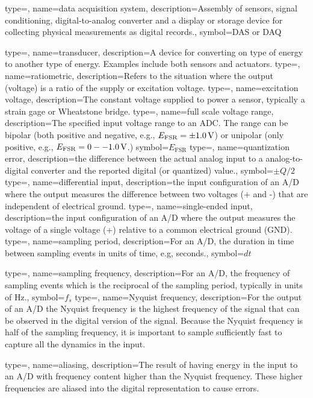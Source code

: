 
{type=\thisgls,
name={data acquisition system},
description={Assembly of sensors, signal conditioning, digital-to-analog converter and a display or storage device for collecting physical measurements as digital records.},
symbol={DAS or DAQ}
}

{type=\thisgls,
name=transducer,
description={A device for converting on type of energy to another type of energy.  Examples include both sensors and actuators.}
}
{type=\thisgls,
name=ratiometric,
description={Refers to the situation where the output (voltage) is a ratio of the supply or excitation voltage.}
}
{type=\thisgls,
name=excitation voltage,
description={The constant voltage supplied to power a sensor, typically a strain gage or Wheatstone bridge.}
}
{type=\thisgls,
name={full scale voltage range},
description={The specified input voltage range to an ADC.  The range can be bipolar (both positive and negative, e.g., $E_{\mathrm{FSR}}=\pm\unit[1.0]{V}$) or unipolar (only positive, e.g.,  $E_{\mathrm{FSR}}=\unit[0--1.0]{V}$.)}
symbol={\ensuremath{E_{\mathrm{FSR}}}}
}
{type=\thisgls,
name={quantization error},
description={the difference between the actual analog input to a analog-to-digital converter and the reported digital (or quantized) value.},
symbol={\ensuremath{\pm Q/2}}
}
{type=\thisgls,
name={differential input},
description={the input configuration of an A/D where the output measures the difference between two voltages (+ and -) that are independent of electrical ground.}
}
{type=\thisgls,
name={single-ended input},
description={the input configuration of an A/D where the output measures the voltage of a single voltage (+) relative to a common electrical ground (GND).}
}
{type=\thisgls,
name={sampling period},
description={For an A/D, the duration in time between sampling events in units of time, e.g, seconds.},
symbol={\ensuremath{dt}}
}

{type=\thisgls,
name={sampling frequency},
description={For an A/D, the frequency of sampling events which is the reciprocal of the sampling period, typically in units of Hz.},
symbol={\ensuremath{f_s}}
}
{type=\thisgls,
name={Nyquist frequency},
description={For the output of an A/D the Nyquist frequency is the highest frequency of the signal that can be observed in the digital version of the signal.  Because the Nyquist frequency is half of the sampling frequency, it is important to sample sufficiently fast to capture all the dynamics in the input.}
}

{type=\thisgls,
name={aliasing},
description={The result of having energy in the input to an A/D with frequency content higher than the Nyquist frequency.  These higher frequencies are aliased into the digital representation to cause errors.}
}
